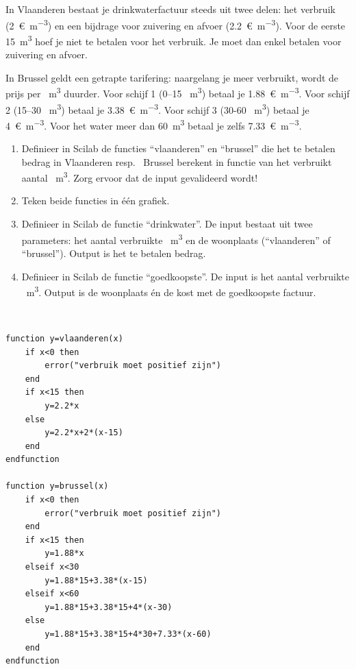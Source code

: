 \begin{oef}
In	Vlaanderen	bestaat 	je	drinkwaterfactuur	steeds	uit	twee	delen:	het	verbruik	(\SI{2}{\euro\per\cubic\metre})  	en een	bijdrage	voor	zuivering	en	afvoer	(\SI{2.2}{\euro\per\cubic\metre}).		Voor	 de	 eerste	\SI{15}{\cubic\metre} hoef	je	
niet	te	betalen	  voor	het	verbruik.	Je	moet	dan	enkel	betalen	 voor	zuivering	en	 afvoer.	

In	 Brussel	geldt	een	getrapte	tarifering: 	naargelang	je	meer	verbruikt,	 wordt	de	 prijs	per	
\SI{}{\cubic\metre} duurder.	Voor	schijf 1	(0--15 \SI{}{\cubic\metre})	betaal	je	\SI{1,88}{\euro\per\cubic\metre}.	Voor	schijf	2	(15--30 \SI{}{\cubic\metre})	
betaal	je	\SI{3,38}{\euro\per\cubic\metre}.	Voor	schijf	3	(30-60 \SI{}{\cubic\metre})	betaal	je	\SI{4}{\euro\per\cubic\metre}.	
Voor	het	water	meer dan	\SI{60}{\cubic\metre} betaal	je	zelfs	 \SI{7,33}{\euro\per\cubic\metre}.
\begin{enumerate}
\item  Definieer	in	Scilab	de	 functies	“vlaanderen” 	en	 “brussel”	die	het	te	betalen	 bedrag	
in	Vlaanderen	resp.	\ Brussel	berekent	in	functie	van	het	verbruikt	aantal \SI{}{\cubic\metre}.	Zorg	
ervoor	dat	de	input	gevalideerd	wordt!
\item Teken	beide	functies	in	één	grafiek.
\item Definieer	in	Scilab	de 	functie	“drinkwater”.	De	input	bestaat	uit	twee	parameters:	
het	aantal	verbruikte \SI{}{\cubic\metre} en	de 	woonplaats	(“vlaanderen”	of	“brussel”).	Output	is	
het	te	betalen	bedrag.
\item Definieer 	in	Scilab	de	 functie	“goedkoopste”.	De	input	is	het	aantal	verbruikte \SI{}{\cubic\metre}.	
Output	is	de 	woonplaats	én 	de	kost	met	de	goedkoopste	factuur.

\end{enumerate}

\begin{opl}
$\qquad$ \\
\begin{lstlisting}[caption={Drinkwaterverbruik in Vlaanderen en in Brussel}]
function y=vlaanderen(x)
    if x<0 then
        error("verbruik moet positief zijn")
    end
    if x<15 then
        y=2.2*x
    else
        y=2.2*x+2*(x-15)
    end
endfunction

function y=brussel(x)
    if x<0 then
        error("verbruik moet positief zijn")
    end
    if x<15 then
        y=1.88*x
    elseif x<30
        y=1.88*15+3.38*(x-15)
    elseif x<60
        y=1.88*15+3.38*15+4*(x-30)
    else
        y=1.88*15+3.38*15+4*30+7.33*(x-60)
    end
endfunction


\end{lstlisting}
\end{opl}
\end{oef}
